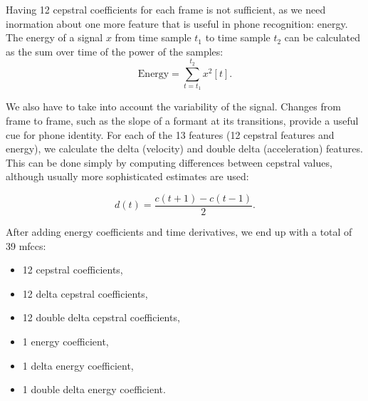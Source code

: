 Having 12 cepstral coefficients for each frame is not sufficient, as we need inormation about one more feature that is useful in phone recognition: energy. The energy of a signal $x$ from time sample $t_{1}$ to time sample $t_{2}$ can be calculated as the sum over time of the power of the samples:
\begin{equation}
  \text{Energy}=\sum_{t=t_{1}}^{t_{2}}x^{2}[t].
\end{equation}

We also have to take into account the variability of the signal. Changes from frame to frame, such as the slope of a formant at its transitions, provide a useful cue for phone identity. For each of the 13 features (12 cepstral features and energy), we calculate the delta (velocity) and double delta (acceleration) features. This can be done simply by computing differences between cepstral values, although usually more sophisticated estimates are used:

\begin{equation}
  d(t)=\frac{c(t+1)-c(t-1)}{2}.
\end{equation}

After adding energy coefficients and time derivatives, we end up with a total of 39 \glspl{mfcc}:
\begin{itemize}
\itemsep0em
\item 12 cepstral coefficients,
\item 12 delta cepstral coefficients,
\item 12 double delta cepstral coefficients,
\item 1 energy coefficient,
\item 1 delta energy coefficient,
\item 1 double delta energy coefficient.
\end{itemize}

